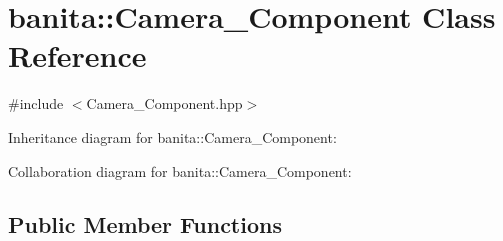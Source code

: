 \hypertarget{classbanita_1_1_camera___component}{}\section{banita\+::Camera\+\_\+\+Component Class Reference}
\label{classbanita_1_1_camera___component}


{\ttfamily \#include $<$Camera\+\_\+\+Component.\+hpp$>$}



Inheritance diagram for banita\+::Camera\+\_\+\+Component\+:


Collaboration diagram for banita\+::Camera\+\_\+\+Component\+:
\subsection*{Public Member Functions}
